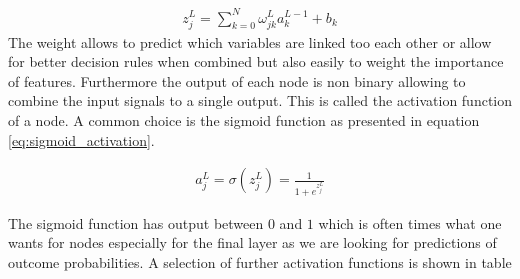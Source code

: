 \begin{align}
    z_j^L = \sum_{k=0}^{N} \omega_{jk}^L a_k^{L-1} + b_k
    \label{eq:node_input}
\end{align}
The weight allows to predict which variables are linked too each other or allow for better decision rules when combined but also easily to weight the importance of features. Furthermore the output of each node is non binary allowing to combine the input signals to a single output. This is called the activation function of a node. A common choice is the sigmoid function as presented in equation \eqref{eq:sigmoid_activation}.~\cite{chollet2015keras}

\begin{align}
    a_j^L = \sigma ( z_j^L ) = \frac{1}{1 + e^{z_j^L}}
    \label{eq:sigmoid_activation}
\end{align}

The sigmoid function has output between $0$ and $1$ which is often times what one wants for nodes especially for the final layer as we are looking for predictions of outcome probabilities. A selection of further activation functions is shown in table


